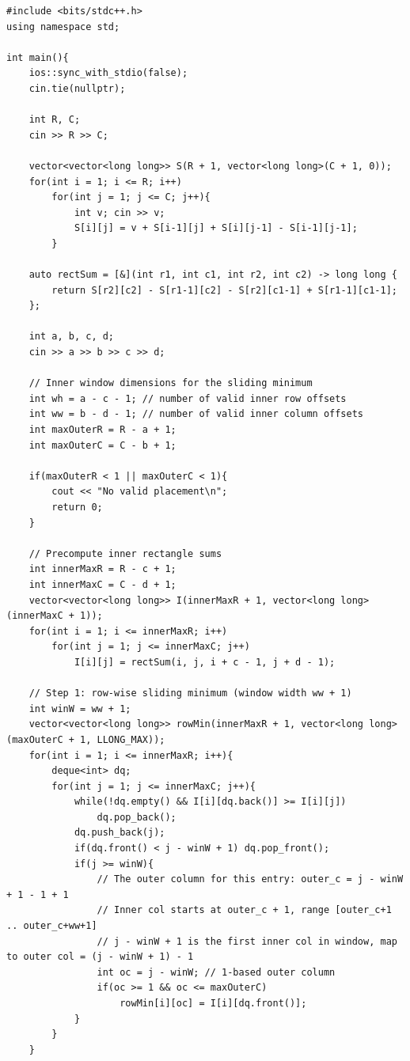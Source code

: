 \documentclass[11pt,a4paper]{article}
\begin{document}
\begin{lstlisting}
#include <bits/stdc++.h>
using namespace std;

int main(){
    ios::sync_with_stdio(false);
    cin.tie(nullptr);

    int R, C;
    cin >> R >> C;

    vector<vector<long long>> S(R + 1, vector<long long>(C + 1, 0));
    for(int i = 1; i <= R; i++)
        for(int j = 1; j <= C; j++){
            int v; cin >> v;
            S[i][j] = v + S[i-1][j] + S[i][j-1] - S[i-1][j-1];
        }

    auto rectSum = [&](int r1, int c1, int r2, int c2) -> long long {
        return S[r2][c2] - S[r1-1][c2] - S[r2][c1-1] + S[r1-1][c1-1];
    };

    int a, b, c, d;
    cin >> a >> b >> c >> d;

    // Inner window dimensions for the sliding minimum
    int wh = a - c - 1; // number of valid inner row offsets
    int ww = b - d - 1; // number of valid inner column offsets
    int maxOuterR = R - a + 1;
    int maxOuterC = C - b + 1;

    if(maxOuterR < 1 || maxOuterC < 1){
        cout << "No valid placement\n";
        return 0;
    }

    // Precompute inner rectangle sums
    int innerMaxR = R - c + 1;
    int innerMaxC = C - d + 1;
    vector<vector<long long>> I(innerMaxR + 1, vector<long long>(innerMaxC + 1));
    for(int i = 1; i <= innerMaxR; i++)
        for(int j = 1; j <= innerMaxC; j++)
            I[i][j] = rectSum(i, j, i + c - 1, j + d - 1);

    // Step 1: row-wise sliding minimum (window width ww + 1)
    int winW = ww + 1;
    vector<vector<long long>> rowMin(innerMaxR + 1, vector<long long>(maxOuterC + 1, LLONG_MAX));
    for(int i = 1; i <= innerMaxR; i++){
        deque<int> dq;
        for(int j = 1; j <= innerMaxC; j++){
            while(!dq.empty() && I[i][dq.back()] >= I[i][j])
                dq.pop_back();
            dq.push_back(j);
            if(dq.front() < j - winW + 1) dq.pop_front();
            if(j >= winW){
                // The outer column for this entry: outer_c = j - winW + 1 - 1 + 1
                // Inner col starts at outer_c + 1, range [outer_c+1 .. outer_c+ww+1]
                // j - winW + 1 is the first inner col in window, map to outer col = (j - winW + 1) - 1
                int oc = j - winW; // 1-based outer column
                if(oc >= 1 && oc <= maxOuterC)
                    rowMin[i][oc] = I[i][dq.front()];
            }
        }
    }


\end{lstlisting}
\end{document}
